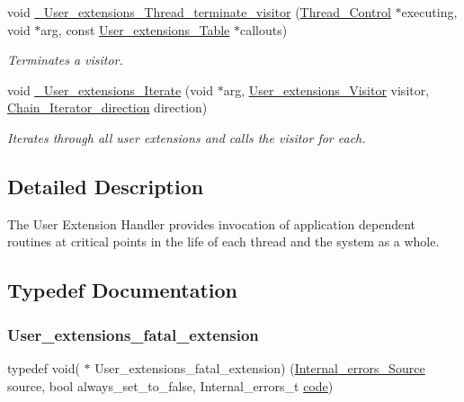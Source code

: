 \begin{DoxyCompactItemize}
void \mbox{\hyperlink{group__RTEMSScoreUserExt_ga5b2b88288d7bad0121611826e46b7962}{\+\_\+\+User\+\_\+extensions\+\_\+\+Thread\+\_\+terminate\+\_\+visitor}} (\mbox{\hyperlink{struct__Thread__Control}{Thread\+\_\+\+Control}} $\ast$executing, void $\ast$arg, const \mbox{\hyperlink{structUser__extensions__Table}{User\+\_\+extensions\+\_\+\+Table}} $\ast$callouts)
\begin{DoxyCompactList}\small\item\em Terminates a visitor. \end{DoxyCompactList}\item 
void \mbox{\hyperlink{group__RTEMSScoreUserExt_ga1246f6873da0a4fae3dd8e8e3b41324b}{\+\_\+\+User\+\_\+extensions\+\_\+\+Iterate}} (void $\ast$arg, \mbox{\hyperlink{group__RTEMSScoreUserExt_ga4f98f3e3ed809cbef39b59d326dc4a16}{User\+\_\+extensions\+\_\+\+Visitor}} visitor, \mbox{\hyperlink{group__RTEMSScoreChain_gac754c64a6c8a46b7b17cf3b7ac33124b}{Chain\+\_\+\+Iterator\+\_\+direction}} direction)
\begin{DoxyCompactList}\small\item\em Iterates through all user extensions and calls the visitor for each. \end{DoxyCompactList}\end{DoxyCompactItemize}


\subsection{Detailed Description}
The User Extension Handler provides invocation of application dependent routines at critical points in the life of each thread and the system as a whole. 



\subsection{Typedef Documentation}
\mbox{\label{group__RTEMSScoreUserExt_gab9b016d654a82fef8666c465c2736a05}} 
\subsubsection{\texorpdfstring{User\_extensions\_fatal\_extension}{User\_extensions\_fatal\_extension}}
{\footnotesize\ttfamily typedef void( $\ast$ User\+\_\+extensions\+\_\+fatal\+\_\+extension) (\mbox{\hyperlink{group__RTEMSScoreIntErr_ga878b4de77df7d0b83d19609d4de42c26}{Internal\+\_\+errors\+\_\+\+Source}} source, bool always\+\_\+set\+\_\+to\+\_\+false, Internal\+\_\+errors\+\_\+t \mbox{\hyperlink{structcode}{code}})}



